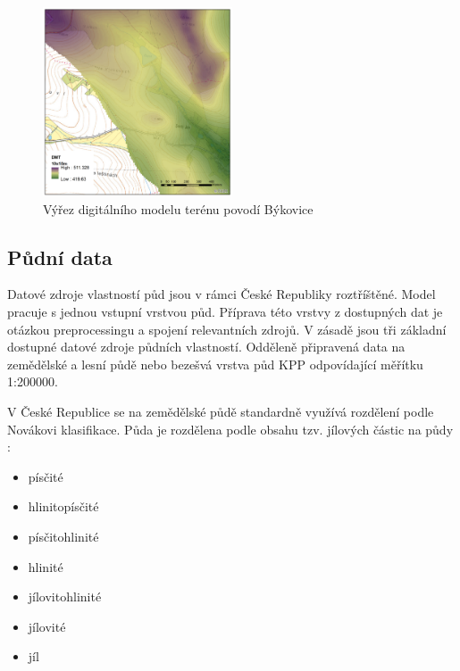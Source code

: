 \begin{figure}
  \centering
  \includegraphics[width=0.5\textwidth]{./img/DMT_byk.png}
  \caption{Výřez digitálního modelu terénu povodí Býkovice}
  \label{fig:bykovicedmt}
\end{figure}

 
 
 
 
 
 
 
 
 
 
 
 
 
 
 
 
 
 
 
\subsection{Půdní data} \label{sec:vstuppuda}

Datové zdroje vlastností půd jsou v rámci České Republiky roztříštěné. Model \smod pracuje s jednou vstupní vrstvou půd. Příprava této vrstvy z dostupných dat je otázkou preprocessingu a spojení relevantních zdrojů. V zásadě jsou tři základní dostupné datové zdroje půdních vlastností. Odděleně připravená  data na zemědělské a lesní půdě nebo bezešvá vrstva půd KPP odpovídající měřítku 1:200000.

V České Republice se na zemědělské půdě standardně využívá rozdělení podle Novákovi klasifikace. Půda je rozdělena podle obsahu tzv. jílových částic na půdy \cite{kavka} :
\begin{itemize} \itemsep -3pt
  \item písčité
  \item hlinitopísčité
  \item písčitohlinité
  \item hlinité
  \item jílovitohlinité
  \item jílovité
  \item jíl
\end{itemize}

